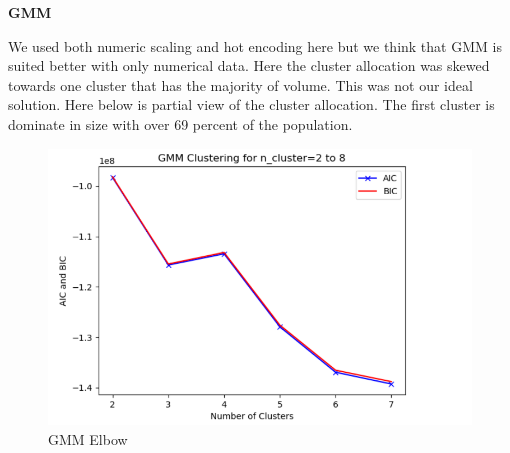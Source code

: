\documentclass[conference]{IEEEtran}
\begin{document}
\begin{center} 
\textbf{GMM} 
\end{center}
We used both numeric scaling and hot encoding here but we think that GMM is suited better with only numerical data.  Here the cluster allocation was skewed towards one cluster that has the majority of volume.  This was not our ideal solution.  Here below is partial view of the cluster allocation.  The first cluster is dominate in size with over 69 percent of the population. 
\begin{figure}[!h]
	\includegraphics[width=\linewidth]{GMM_Clutering.png}
	\caption{GMM Elbow}
	\label{fig: GMM Elbow}
 \end{figure}
\end{document}
